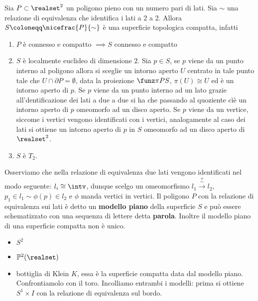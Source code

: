 \begin{observe}
	Sia $P\subset\realset^2$ un poligono pieno con un numero pari di lati. Sia $\sim$ una relazione di equivalenza che identifica i lati a 2 a 2. Allora $S\coloneqq\nicefrac{P}{\sim}$ è una superficie topologica compatta, infatti
		\begin{enumerate}
			\item  $P$ è connesso e compatto $\implies S$ connesso e compatto
			\item $S$ è localmente euclideo di dimensione $2$. Sia $p\in S$, se $p$ viene da un punto interno al poligono allora si sceglie un intorno aperto $U$ centrato in tale punto tale che $U\cap\partial{P}=\emptyset$, data la proiezione $\funz \pi P S$, $\pi(U)\cong U$ ed è un intorno aperto di $p$. Se $p$ viene da un punto interno ad un lato grazie all'dentificazione dei lati a due a due si ha che passando al quoziente cìè un intorno aperto di $p$ omeomorfo ad un disco aperto. Se $p$ viene da un vertice, siccome i vertici vengono identificati con i vertici, analogamente al caso dei lati si ottiene un intorno aperto di $p$ in $S$ omeomorfo ad un disco aperto di $\realset^2$.
			\item $S$ è $T_2$.
		\end{enumerate}
	Osserviamo che nella relazione di equivalenza due lati vengono identificati nel modo seguente: $l_i\cong\intv$, dunque scelgo un omeomorfismo $l_1\stackrel{\stackrel{\phi}{\sim}}{\longrightarrow} l_2$, $p_1\in l_1 \sim \phi(p)\in l_2$ e $\phi$ manda vertici in vertici.
	Il poligono $P$ con la relazione di equivalenza sui lati è detto un \textbf{modello piano} della superficie $S$ e può essere schematizzato con una sequenza di lettere detta \textbf{parola}. Inoltre il modello piano di una superficie compatta non è unico.
\end{observe}

\begin{examples}
	\begin{itemize}
		\item $S^2$
		\item $\mathbb{P}^2(\realset)$
		\item bottiglia di Klein $K$, essa è la superficie compatta data dal modello piano. Confrontiamolo con il toro. Incolliamo entrambi i modelli: prima si ottiene $S^1\times I$ con la relazione di equivalenza sul bordo.
	\end{itemize}
\end{examples}

